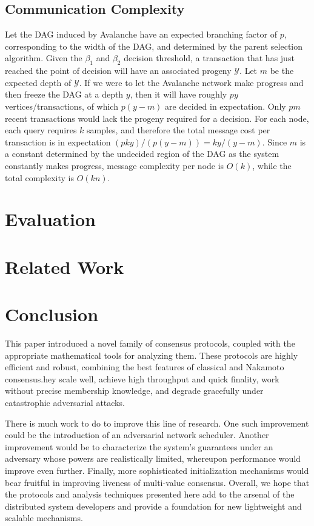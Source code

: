 \documentclass[letterpaper,twocolumn,10pt]{article}
\newcommand{\tronly}[2]{#1}
\theoremstyle{definition}
\begin{document}
\subsection{Communication Complexity}
Let the DAG induced by Avalanche have an expected branching factor of $p$, corresponding to the width of the DAG, and determined by the parent selection algorithm.
Given the $\beta_1$ and $\beta_2$ decision threshold, a transaction that has just reached the point of decision will have an associated progeny $\mathcal{Y}$.
Let $m$ be the expected depth of $\mathcal{Y}$.
If we were to let the Avalanche network make progress and then freeze the DAG at a depth $y$,
then it will have roughly $py$ vertices/transactions, of which $p(y - m)$ are decided in expectation.
Only $pm$ recent transactions would lack the progeny required for a decision.
For each node, each query requires $k$ samples, and therefore the total message cost per transaction is in expectation $(pky) / (p(y - m)) = ky/(y-m)$.
Since $m$ is a constant determined by the undecided region of the DAG as the system constantly makes progress, message complexity per node is $O(k)$, while the total complexity is $O(kn)$.

\section{Evaluation}
\label{sec:evaluation}


\section{Related Work}
\label{sec:related-work}


\section{Conclusion}
\label{sec:conclusions}
This paper introduced a novel family of consensus protocols, coupled with the appropriate mathematical tools for analyzing them.
\tronly{These protocols are highly efficient and robust, combining the best features of classical and Nakamoto consensus.}
They scale well, achieve high throughput and quick finality, work without precise membership knowledge, and degrade gracefully under catastrophic adversarial attacks.

There is much work to do to improve this line of research. \tronly{
One such improvement could be the introduction of an adversarial network scheduler.
Another}{One} improvement would be to characterize the system's guarantees under an adversary whose powers are realistically limited, whereupon performance would improve even further. \tronly{Finally, more}{More} sophisticated initialization mechanisms would bear fruitful in improving liveness of multi-value consensus.
Overall, we hope that the protocols and analysis techniques presented here add to the arsenal of the distributed system developers and provide a foundation for new lightweight and scalable mechanisms.
\end{document}
